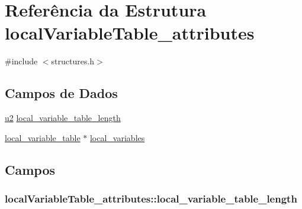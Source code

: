 \hypertarget{structlocalVariableTable__attributes}{}\section{Referência da Estrutura local\+Variable\+Table\+\_\+attributes}
\label{structlocalVariableTable__attributes}


{\ttfamily \#include $<$structures.\+h$>$}

\subsection*{Campos de Dados}
\begin{DoxyCompactItemize}
\item 
\hyperlink{lista__operandos_8h_a732cde1300aafb73b0ea6c2558a7a54f}{u2} \hyperlink{structlocalVariableTable__attributes_a3ae381679f6b069984bfec2618cc40e4}{local\+\_\+variable\+\_\+table\+\_\+length}
\item 
\hyperlink{structlocal__variable__table}{local\+\_\+variable\+\_\+table} $\ast$ \hyperlink{structlocalVariableTable__attributes_a78911369e8a4c58d93f579613144a8c2}{local\+\_\+variables}
\end{DoxyCompactItemize}


\subsection{Campos}
\subsubsection[{\texorpdfstring{local\+\_\+variable\+\_\+table\+\_\+length}{local_variable_table_length}}]{ local\+Variable\+Table\+\_\+attributes\+::local\+\_\+variable\+\_\+table\+\_\+length}\hypertarget{structlocalVariableTable__attributes_a3ae381679f6b069984bfec2618cc40e4}{}\label{structlocalVariableTable__attributes_a3ae381679f6b069984bfec2618cc40e4}
